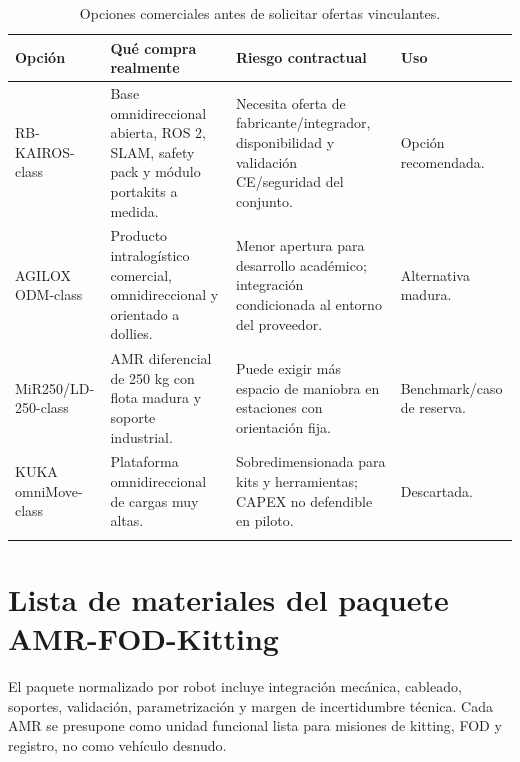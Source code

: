\begin{longtable}{P{0.20\textwidth}P{0.28\textwidth}P{0.26\textwidth}P{0.16\textwidth}}
\toprule
Opción & Qué compra realmente & Riesgo contractual & Uso\\
\midrule
\endhead
RB-KAIROS-class & Base omnidireccional abierta, ROS 2, SLAM, safety pack y módulo portakits a medida. & Necesita oferta de fabricante/integrador, disponibilidad y validación CE/seguridad del conjunto. & Opción recomendada.\\
AGILOX ODM-class & Producto intralogístico comercial, omnidireccional y orientado a dollies. & Menor apertura para desarrollo académico; integración condicionada al entorno del proveedor. & Alternativa madura.\\
MiR250/LD-250-class & AMR diferencial de 250 kg con flota madura y soporte industrial. & Puede exigir más espacio de maniobra en estaciones con orientación fija. & Benchmark/caso de reserva.\\
KUKA omniMove-class & Plataforma omnidireccional de cargas muy altas. & Sobredimensionada para kits y herramientas; CAPEX no defendible en piloto. & Descartada.\\
\bottomrule
\caption{Opciones comerciales antes de solicitar ofertas vinculantes.}
\label{tab:opciones-comerciales}
\end{longtable}

\section{Lista de materiales del paquete AMR-FOD-Kitting}

El paquete normalizado por robot incluye integración mecánica, cableado, soportes, validación, parametrización y margen de incertidumbre técnica. Cada AMR se presupone como unidad funcional lista para misiones de kitting, FOD y registro, no como vehículo desnudo.

